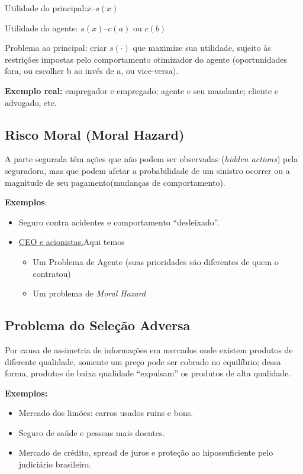\documentclass[a4paper,12pt]{article}[abntex2]
\begin{document}
Utilidade do principal:\( x – s(x)\)

Utilidade do agente: \(s(x) – c(a)\) ou \(c(b)\)

Problema ao principal: criar \(s(\cdot)\) que maximize sua utilidade, sujeito às restrições impostas pelo comportamento otimizador do agente (oportunidades fora, ou escolher b ao invés de a, ou vice-versa). 

\textbf{Exemplo real:} empregador e empregado; agente e seu mandante; cliente e advogado, etc.

\subsection{\textbf{Risco Moral (Moral Hazard)}}
A parte segurada têm ações que não podem ser observadas (\textit{hidden actions}) pela seguradora, mas que podem afetar a probabilidade de um sinistro ocorrer ou a magnitude de seu pagamento(mudanças de comportamento).

\textbf{Exemplos}:\begin{itemize}
    \item Seguro contra acidentes e comportamento “desleixado”.
    \item \href{https://money.cnn.com/galleries/2009/news/0909/gallery.highest_paid_worst_CEOs/index.html}{CEO e acionistas.}Aqui temos\begin{itemize}
        \item Um Problema de Agente (suas prioridades são diferentes de quem o contratou)
        \item Um problema de \textit{Moral Hazard}
    \end{itemize}
\end{itemize}

\subsection{\textbf{Problema do Seleção Adversa}}
Por causa de assimetria de informações em mercados onde existem produtos de diferente qualidade, somente um preço pode ser cobrado no equilíbrio; dessa forma, produtos de baixa qualidade “expulsam” os produtos de alta qualidade. 

\textbf{Exemplos:}\begin{itemize}
    \item Mercado dos limões: carros usados ruins e bons. 
    \item Seguro de saúde e pessoas mais doentes.
    \item Mercado de crédito, spread de juros e proteção ao hipossuficiente pelo judiciário brasileiro.
\end{itemize}
\end{document}
